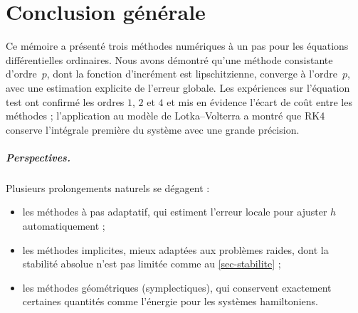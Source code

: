 \chapter*{Conclusion générale}

Ce mémoire a présenté trois méthodes numériques à un pas pour les équations différentielles ordinaires. Nous avons démontré qu'une méthode consistante d'ordre~$p$, dont la fonction d'incrément est lipschitzienne, converge à l'ordre~$p$, avec une estimation explicite de l'erreur globale. Les expériences sur l'équation test ont confirmé les ordres $1$, $2$ et $4$ et mis en évidence l'écart de coût entre les méthodes ; l'application au modèle de Lotka--Volterra a montré que RK4 conserve l'intégrale première du système avec une grande précision.

\paragraph{Perspectives.}
Plusieurs prolongements naturels se dégagent :
\begin{itemize}[itemsep=2pt]
  \item les méthodes à pas adaptatif, qui estiment l'erreur locale pour ajuster $h$ automatiquement ;
  \item les méthodes implicites, mieux adaptées aux problèmes raides, dont la stabilité absolue n'est pas limitée comme au \cref{sec-stabilite} ;
  \item les méthodes géométriques (symplectiques), qui conservent exactement certaines quantités comme l'énergie pour les systèmes hamiltoniens.
\end{itemize}
